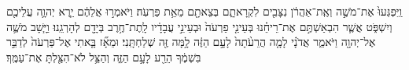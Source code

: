 \documentclass{openreader}
\begin{document}
וַֽיִּפְגְּעוּ֙ אֶת־מֹשֶׁ֣ה וְאֶֽת־אַהֲרֹ֔ן נִצָּבִ֖ים לִקְרָאתָ֑ם בְּצֵאתָ֖ם מֵאֵ֥ת פַּרְעֹֽה׃ 
וַיֹּאמְר֣וּ אֲלֵהֶ֔ם יֵ֧רֶא יְהוָ֛ה עֲלֵיכֶ֖ם וְיִשְׁפֹּ֑ט אֲשֶׁ֧ר הִבְאַשְׁתֶּ֣ם אֶת־רֵיחֵ֗נוּ בְּעֵינֵ֤י פַרְעֹה֙ וּבְעֵינֵ֣י עֲבָדָ֔יו לָֽתֶת־חֶ֥רֶב בְּיָדָ֖ם לְהָרְגֵֽנוּ׃ 
וַיָּ֧שָׁב מֹשֶׁ֛ה אֶל־יְהוָ֖ה וַיֹּאמַ֑ר אֲדֹנָ֗י לָמָ֤ה הֲרֵעֹ֨תָה֙ לָעָ֣ם הַזֶּ֔ה לָ֥מָּה זֶּ֖ה שְׁלַחְתָּֽנִי׃ 
וּמֵאָ֞ז בָּ֤אתִי אֶל־פַּרְעֹה֙ לְדַבֵּ֣ר בִּשְׁמֶ֔ךָ הֵרַ֖ע לָעָ֣ם הַזֶּ֑ה וְהַצֵּ֥ל לֹא־הִצַּ֖לְתָּ אֶת־עַמֶּֽךָ׃ 
\end{document}
